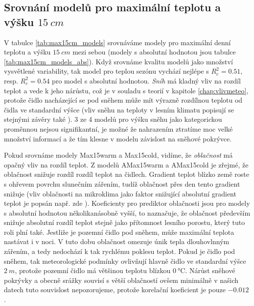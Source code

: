 \subsection{Srovnání modelů pro maximální teplotu a výšku $\SI{15}{cm}$}
V tabulce \ref{tab:max15cm_models} srovnáváme modely pro maximální denní teplotu a výšku $\SI{15}{cm}$ mezi sebou (modely s absolutní hodnotou jsou tabulce \ref{tab:max15cm_models_abs}). Když srovnáme kvalitu modelů jako množství vysvětlené variability, tak model pro teplou sezónu vychází nejlépe s $R_c^2 = 0.51$, resp. $R_c^2 = 0.54$ pro model s absolutní hodnotou. \textit{Sníh} má kladný vliv na rozdíl teplot a vede k jeho nárůstu, což je v souladu s teorií v kapitole \ref{chap:vlivmeteo}, protože čidlo nacházející se pod sněhem může mít výrazně rozdílnou teplotu od čidla ve standardní výšce (vliv sněhu na teploty v lesním klimatu popisují se stejnými závěry také \cite{snow_deFrenneForestMicroclimates}). 3 ze 4 modelů pro výšku sněhu jako kategorickou proměnnou nejsou signifikantní, je možné že nahrazením ztratíme moc velké množství informací a že tím klesne v modelu závislost na sněhové pokrývce.

Pokud srovnáme modely Max15warm a Max15cold, vidíme, že \textit{oblačnost} má opačný vliv na rozdíl teplot. Z modelů AMax15warm a AMax15cold je zřejmé, že oblačnost snižuje rozdíl rozdíl teplot na čidlech. Gradient teplot blízko země roste s ohřevem povrchu slunečním zářením, tudíž oblačnost přes den tento gradient snižuje (vliv oblačnosti na mikroklima jako faktor snižující absolutní gradient teplot je popsán např. zde \cite{snow_deFrenneForestMicroclimates, cloud_overwinteringclusters}). Koeficienty pro prediktor oblačnosti jsou pro modely s absolutní hodnotou několikanásobně vyšší, to naznačuje, že oblačnost především snižuje absolutní rozdíl teplot stejně jako přítomnost lesního porostu, který tuto roli plní také. Jestliže je pozemní čidlo pod sněhem, může maximální teplota nastávat i v noci. V tuto dobu oblačnost omezuje únik tepla dlouhovlnným zářením, a tedy nedochází k tak rychlému poklesu teplot. Pokud je čidlo pod sněhem, tak meteorologické podmínky ovlivňují hlavně čidlo ve standardní výšce $\SI{2}{m}$, protože pozemní čidlo má většinou teplotu blízkou $\SI{0}{\celsius}$. Nárůst sněhové pokrývky a obecně srážky souvisí s větší oblačností ovšem minimálně v našich datech tuto souvislost nepozorujeme, protože korelační koeficient je pouze $-0.012$.

